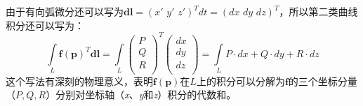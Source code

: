 由于有向弧微分还可以写为$\boldsymbol{dl}=\left( x'\,\,y'\,\,z' \right) ^Tdt=\left( dx\,\,dy\,\,dz \right) ^T$，所以第二类曲线积分还可以写为：
\[
\int\limits_L{\boldsymbol{f}\left( \boldsymbol{p} \right) ^T\boldsymbol{dl}}=\int\limits_L{\left( \begin{array}{c}
	P\\
	Q\\
	R\\
\end{array} \right) ^T\left( \begin{array}{c}
	dx\\
	dy\\
	dz\\
\end{array} \right)}=\int\limits_L{P\cdot dx+Q\cdot dy+R\cdot dz}
\]
这个写法有深刻的物理意义，表明$\boldsymbol{f}\left( \boldsymbol{p} \right) $在$L$上的积分可以分解为$\boldsymbol{f}$的三个坐标分量（$P,Q,R$）分别对坐标轴（{\it x}、{\it y}和{\it z}）积分的代数和。




